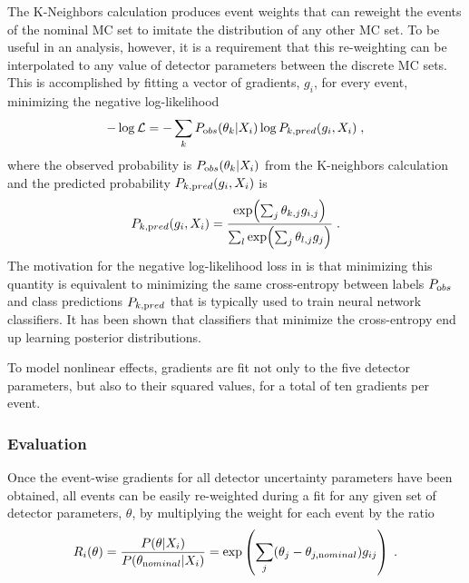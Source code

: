 The K-Neighbors calculation produces event weights that can reweight the events of the nominal MC set to imitate the distribution of any other MC set. To be useful in an analysis, however, it is a requirement that this re-weighting can be interpolated to any value of detector parameters between the discrete MC sets. This is accomplished by fitting a vector of gradients, $g_i$, for every event, minimizing the negative log-likelihood
\begin{equation}
    -\log\mathcal{L} = -\sum_k P_{\rm obs}(\theta_k | X_i) \log P_{k, \rm pred}(g_i, X_i)\;, \label{eq:grad-nllh}
\end{equation}
where the observed probability is $P_{\rm obs}(\theta_k | X_i)$ from the K-neighbors calculation and the  predicted probability $P_{k, \rm pred}(g_i, X_i)$ is
\begin{equation}
    P_{k, \rm pred}(g_i, X_i) = \frac{\exp(\sum_j \theta_{k,j} g_{i,j})}{\sum_l\exp(\sum_j \theta_{l,j} g_j)}\;.
\end{equation}
The motivation for the negative log-likelihood loss in  is that minimizing this quantity is equivalent to minimizing the same cross-entropy between labels $P_{\rm obs}$ and class predictions $P_{k, \rm pred}$ that is typically used to train neural network classifiers. It has been shown that classifiers that minimize the cross-entropy end up learning posterior distributions\cite{NNPosteriors}.

To model nonlinear effects, gradients are fit not only to the five detector parameters, but also to their squared values, for a total of ten gradients per event.

\subsubsection{Evaluation}
Once the event-wise gradients for all detector uncertainty parameters have been obtained, all events can be easily re-weighted during a fit for any given set of detector parameters, $\theta$, by multiplying the weight for each event by the ratio
\begin{equation}
    R_i(\theta)=\frac{P(\theta|X_i)}{P(\theta_{\rm nominal}|X_i)}=\exp\left(\sum_j (\theta_j - \theta_{j, \rm nominal}) g_{ij}\right)\;.\label{eq:ultrasurf-eval}
\end{equation}

